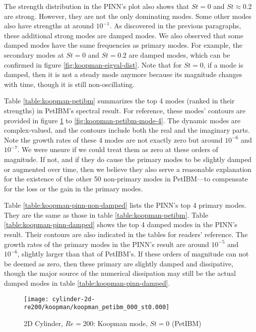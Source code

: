 The strength distribution in the PINN's plot also shows that $St=0$ and $St\approx 0.2$ are strong.
However, they are not the only dominating modes.  
Some other modes also have strengths at around $10^{-1}$.
As discovered in the previous paragraphs, these additional strong modes are damped modes.
We also observed that some damped modes have the same frequencies as primary modes.
For example, the secondary modes at $St=0$ and $St=0.2$ are damped modes, which can be confirmed in figure \ref{fig:koopman-eigval-dist}.
Note that for $St=0$, if a mode is damped, then it is not a steady mode anymore because its magnitude changes with time, though it is still non-oscillating.



Table \ref{table:koopman-petibm} summarizes the top 4 modes (ranked in their strengths) in PetIBM's spectral result.
For reference, these modes' contours are provided in figure \ref{fig:koopman-petibm-mode-1} to \ref{fig:koopman-petibm-mode-4}.
The dynamic modes are complex-valued, and the contours include both the real and the imaginary parts.
Note the growth rates of these 4 modes are not exactly zero but around $10^{-6}$ and $10^{-7}$.
We were unsure if we could treat them as zero at these orders of magnitude.
If not, and if they do cause the primary modes to be slightly damped or augmented over time, then we believe they also serve a reasonable explanation for the existence of the other 50 non-primary modes in PetIBM---to compensate for the loss or the gain in the primary modes.

Table \ref{table:koopman-pinn-non-damped} lists the PINN's top 4 primary modes. They are the same as those in table \ref{table:koopman-petibm}.
Table \ref{table:koopman-pinn-damped} shows the top 4 damped modes in the PINN's result.
Their contours are also indicated in the tables for readers' reference.
The growth rates of the primary modes in the PINN's result are around $10^{-5}$ and $10^{-6}$, slightly larger than that of PetIBM's.
If these orders of magnitude can not be deemed as zero, then these primary are slightly damped and dissipative, though the major source of the numerical dissipation may still be the actual damped modes in table \ref{table:koopman-pinn-damped}.



\begin{figure}[hbt!]
    \centering
    \texttt{[image: cylinder-2d-re200/koopman/koopman\_petibm\_000\_st0.000]}
    \caption{2D Cylinder, $Re=200$: Koopman mode, $St=0$ (PetIBM)}
    \label{fig:koopman-petibm-mode-1}
\end{figure}

